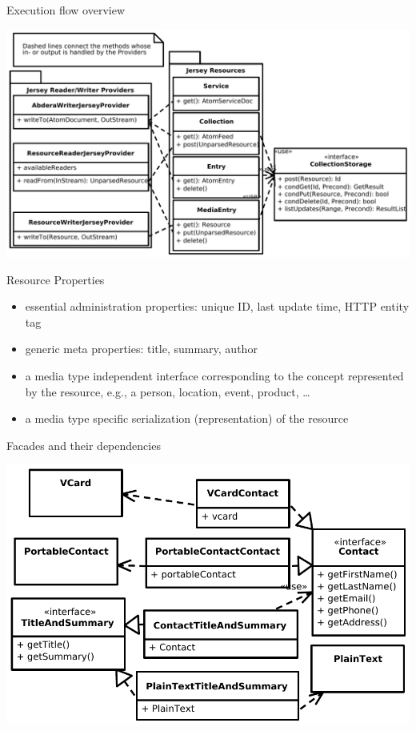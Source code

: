 \documentclass{beamer}
\begin{document}
\begin{frame}{Execution flow overview}
  \begin{center}
    \includegraphics[width=1\textwidth]{images/executionflowoverview}
  \end{center}
\end{frame}

\begin{frame}{Resource Properties}
\begin{itemize}
\item essential administration properties: unique ID, last update time, HTTP
  entity tag
\item generic meta properties: title, summary, author
\item a media type independent interface corresponding to the concept represented
  by the resource, e.g., a person, location, event, product, \ldots
\item a media type specific serialization (representation) of the resource
\end{itemize}

\end{frame}

\begin{frame}{Facades and their dependencies}
  \begin{center}
    \includegraphics[width=1\textwidth]{images/titleandsummary}
  \end{center}
\end{frame}
\end{document}

